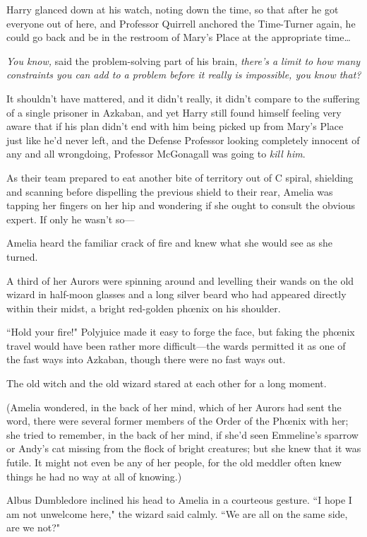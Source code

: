 Harry glanced down at his watch, noting down the time, so that after he got everyone out of here, and Professor Quirrell anchored the Time-Turner again, he could go back and be in the restroom of Mary's Place at the appropriate time{\ldots}

\emph{You know,} said the problem-solving part of his brain, \emph{there's a limit to how many constraints you can add to a problem before it \emph{really is} impossible, you know that?}

It shouldn't have mattered, and it didn't really, it didn't compare to the suffering of a single prisoner in Azkaban, and yet Harry still found himself feeling very aware that if his plan didn't end with him being picked up from Mary's Place just like he'd never left, and the Defense Professor looking completely innocent of any and all wrongdoing, Professor McGonagall was going to \emph{kill him}.

\later

As their team prepared to eat another bite of territory out of C spiral, shielding and scanning before dispelling the previous shield to their rear, Amelia was tapping her fingers on her hip and wondering if she ought to consult the obvious expert. If only he wasn't so—

Amelia heard the familiar crack of fire and knew what she would see as she turned.

A third of her Aurors were spinning around and levelling their wands on the old wizard in half-moon glasses and a long silver beard who had appeared directly within their midst, a bright red-golden phœnix on his shoulder.

``Hold your fire!" Polyjuice made it easy to forge the face, but faking the phœnix travel would have been rather more difficult—the wards permitted it as one of the fast ways into Azkaban, though there were no fast ways out.

The old witch and the old wizard stared at each other for a long moment.

(Amelia wondered, in the back of her mind, which of her Aurors had sent the word, there were several former members of the Order of the Phœnix with her; she tried to remember, in the back of her mind, if she'd seen Emmeline's sparrow or Andy's cat missing from the flock of bright creatures; but she knew that it was futile. It might not even be any of her people, for the old meddler often knew things he had no way at all of knowing.)

Albus Dumbledore inclined his head to Amelia in a courteous gesture. ``I hope I am not unwelcome here," the wizard said calmly. ``We are all on the same side, are we not?"

